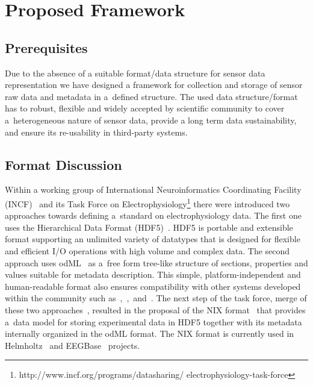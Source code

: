 \documentclass[conference]{IEEEtran}
\begin{document}
\section{Proposed Framework}\label{sec:framework}

\subsection{Prerequisites}\label{sec:requirements}

Due to the absence of a suitable format/data structure for sensor data representation we have designed a framework for collection and storage of sensor raw data and metadata in a~defined structure. The used data structure/format has to robust, flexible and widely accepted by scientific community to cover a~heterogeneous nature of sensor data, provide a long term data sustainability, and ensure its re-usability in third-party systems.

\subsection{Format Discussion}

Within a working group of International Neuroinformatics Coordinating Facility (INCF)~\cite{wvangeit:Bjaalie:JNeurosci:2007} and its Task Force on Electrophysiology\footnote{http://www.incf.org/programs/datasharing/ electrophysiology-task-force} there were introduced two approaches towards defining a~standard on electrophysiology data. The first one uses the Hierarchical Data Format (HDF5)~\cite{hdf5}. HDF5 is portable and extensible format supporting an unlimited variety of datatypes that is designed for flexible and efficient I/O operations with high volume and complex data. The second approach uses odML~\cite{10.3389/fninf.2011.00016} as a~free form tree-like structure of sections, properties and values suitable for metadata description. This simple, platform-independent and human-readable format also ensures compatibility with other systems developed within the community such as~\cite{10.3389/conf.fninf.2014.18.00029},~\cite{10.3389/conf.fninf.2014.18.00053},~and~\cite{10.3389/conf.fninf.2013.09.00025}. The next step of the task force, merge of these two approaches~\cite{10.3389/conf.fninf.2013.09.00069}, resulted in the proposal of the NIX format~\cite{Stoewer:2014} that provides a~data model for storing experimental data in HDF5 together with its metadata internally organized in the odML format. The NIX format is currently used in Helmholtz~\cite{10.3389/conf.fninf.2013.09.00025} and EEGBase~\cite{ISI:000306821100004} projects.
\end{document}
